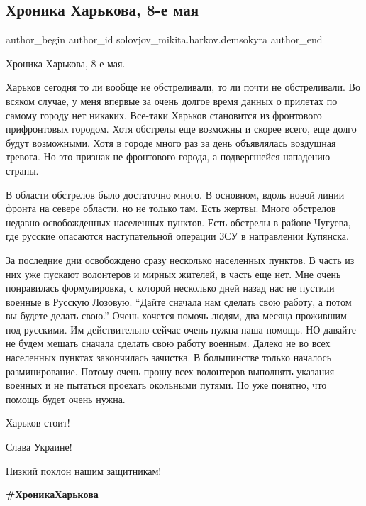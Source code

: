  
 
 
 
 
 
\subsection{Хроника Харькова, 8-е мая}
\label{sec:08_05_2022.fb.solovjov_mikita.harkov.demsokyra.1.hronika}
 
\ifcmt
 author_begin
   author_id solovjov_mikita.harkov.demsokyra
 author_end
\fi

Хроника Харькова, 8-е мая. 

Харьков сегодня то ли вообще не обстреливали, то ли почти не обстреливали. Во
всяком случае, у меня впервые за очень долгое время данных о прилетах по самому
городу нет никаких. Все-таки Харьков становится из фронтового прифронтовых
городом. Хотя обстрелы еще возможны и скорее всего, еще долго будут возможными.
Хотя в городе много раз за день объявлялась воздушная тревога. Но это признак
не фронтового города, а подвергшейся нападению страны. 

В области обстрелов было достаточно много. В основном, вдоль новой линии фронта
на севере области, но не только там. Есть жертвы. Много обстрелов недавно
освобожденных населенных пунктов. Есть обстрелы в районе Чугуева, где русские
опасаются наступательной операции ЗСУ в направлении Купянска. 

За последние дни освобождено сразу несколько населенных пунктов. В часть из них
уже пускают волонтеров и мирных жителей, в часть еще нет. Мне очень понравилась
формулировка, с которой несколько дней назад нас не пустили военные в Русскую
Лозовую. \enquote{Дайте сначала нам сделать свою работу, а потом вы будете делать
свою.} Очень хочется помочь людям, два месяца прожившим под русскими. Им
действительно сейчас очень нужна наша помощь. НО давайте не будем мешать
сначала сделать свою работу военным. Далеко не во всех населенных пунктах
закончилась зачистка. В большинстве только началось разминирование. Потому
очень прошу всех волонтеров выполнять указания военных и не пытаться проехать
окольными путями. Но уже понятно, что помощь будет очень нужна. 

Харьков стоит!

Слава Украине!

Низкий поклон нашим защитникам!

\textbf{\#ХроникаХарькова}

